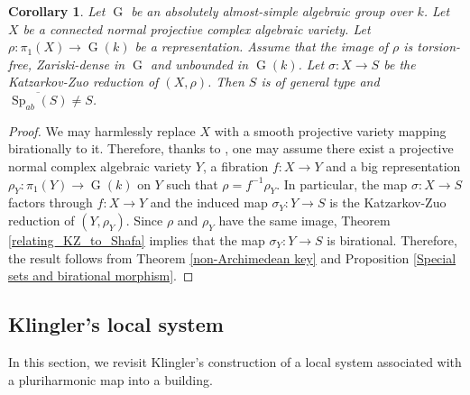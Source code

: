 \documentclass[11pt,letterpaper]{amsart}
\theoremstyle{plain}
\newtheorem{cor}[thm]{Corollary}
\DeclareMathOperator{\Sp}{Sp}
\DeclareMathOperator{\rG}{G}
\begin{document}
\begin{cor}\label{Katzarkov-Zuo images satisfy Lang}
Let $\rG$ be an absolutely almost-simple algebraic group over $k$. Let $X$ be a connected normal projective complex algebraic variety. Let $\rho \colon \pi_1(X) \rightarrow \rG(k)$ be a representation. Assume that the image of $\rho$ is torsion-free, Zariski-dense in $\rG$ and unbounded in $\rG(k)$. Let $\sigma \colon X \to S$ be the Katzarkov-Zuo reduction of $(X,\rho)$. Then $S$ is of general type and $\overline{\Sp_{ab}(S)} \neq S$.   
\end{cor}

\begin{proof}
We may harmlessly replace $X$ with a smooth projective variety mapping birationally to it. Therefore, thanks to \cite[Lemma 2.7]{CCE}, one may assume there exist a projective normal complex algebraic variety $Y$, a fibration $f \colon X \to Y$ and a big representation $\rho_Y \colon \pi_1(Y) \rightarrow \rG(k)$ on $Y$ such that $\rho = f^{-1} \rho_Y$. In particular, the map $\sigma \colon X \to S$ factors through $f \colon X \to Y$ and the induced map $\sigma_Y \colon Y \to S$ is the Katzarkov-Zuo reduction of $(Y,\rho_Y)$. Since $\rho$ and $\rho_Y$ have the same image, Theorem \ref{relating_KZ_to_Shafa} implies that the map $\sigma_Y \colon Y \to S$ is birational. Therefore, the result follows from Theorem \ref{non-Archimedean key} and Proposition \ref{Special sets and birational morphism}.
\end{proof}
 


\subsection{Klingler's local system}\label{A construction of Klingler}
In this section, we revisit Klingler’s construction \cite[Section 2.2.2]{Klingler2003} of a local system associated with a pluriharmonic map into a building.
\end{document}
